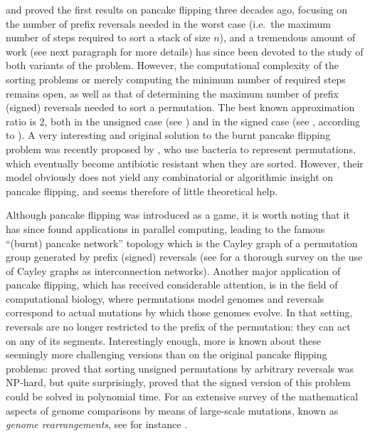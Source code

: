 \documentclass[review]{elsarticle}
\newcommand{\ie}{i.e.\ }
\begin{document}
\citet{gates-bounds} and \citet{gyori-stack} proved the first results on pancake flipping three decades ago, focusing on the number of prefix reversals needed in the worst case (\ie the maximum number of steps required to sort a stack of size $n$), and a tremendous amount of work (see next paragraph for more details) has since been devoted to the study of both variants of the problem. 
However, the computational complexity of the sorting problems or merely computing the minimum number of required steps remains open, as well as that of determining the maximum number of prefix (signed) reversals needed to sort a permutation. The best known approximation ratio is $2$, both in the unsigned case (see \citet{fischer-approx}) 
and in the signed case (see \citet{cohen-burnt}, according to \citet{fischer-approx}). 
A very interesting and original solution to the burnt pancake flipping problem was recently proposed by \citet{haynes-engineering}, who use bacteria to represent permutations, which eventually become antibiotic resistant when they are sorted. However, their model obviously does not yield any combinatorial or algorithmic insight on pancake flipping, and seems therefore of little theoretical help.

Although pancake flipping was introduced as a game, it is worth noting that it has since found applications in parallel computing, leading to the famous ``(burnt) pancake network'' topology which is the Cayley graph of a permutation group generated by prefix (signed) reversals (see \citet{lakshmivarahan-symmetry} for a thorough survey on the use of Cayley graphs as interconnection networks). Another major application of pancake flipping, which has received considerable attention, is in the field of computational biology, where permutations model genomes and reversals correspond to actual mutations by which those genomes evolve. In that setting, reversals are no longer restricted to the prefix of the permutation: they can act on any of its segments. Interestingly enough, more is known about these seemingly more challenging versions than on the original pancake flipping problems: \citet{caprara-sorting} proved that sorting unsigned permutations by arbitrary reversals was NP-hard, but quite surprisingly, \citet{hannenhalli-transforming} proved that the signed version of this problem could be solved in polynomial time. For an extensive survey of the mathematical aspects of genome comparisons by means of large-scale mutations, known as \emph{genome rearrangements}, see for instance \citet{fertin-combinatorics}.
\end{document}
